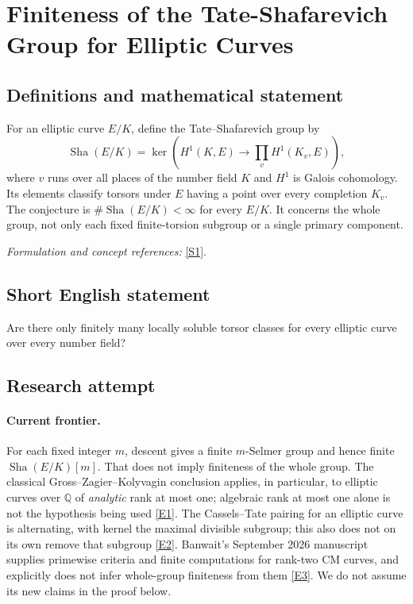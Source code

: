 \documentclass[11pt,a4paper]{article}
\newcommand{\Q}{\mathbb{Q}}
\newcommand{\sref}[2]{\hyperlink{source:#1:#2}{[S#2]}}
\newcommand{\eref}[2]{\hyperlink{extra:#1:#2}{[E#2]}}
\newif\ifshowcatalogue
\newcommand{\cataloguescope}[1]{\ifshowcatalogue
 \paragraph{Exact scope in the supplied catalogue.}
 \begin{quote}\small #1\end{quote}\fi}
\numberwithin{equation}{section}
\begin{document}
\setcounter{section}{0}
\clearpage
\section*{\texorpdfstring{Finiteness of the Tate-Shafarevich Group for Elliptic Curves}{Finiteness of the Tate-Shafarevich Group for Elliptic Curves}}\label{30006701}
\subsection{Definitions and mathematical statement}
For an elliptic curve $E/K$, define the Tate--Shafarevich group by
\[
 \operatorname{Sha}(E/K)=\ker\!\left(H^1(K,E)\longrightarrow\prod_v H^1(K_v,E)\right),
\]
where $v$ runs over all places of the number field $K$ and $H^1$ is Galois cohomology. Its elements classify torsors under $E$ having a point over every completion $K_v$. The conjecture is $\#\operatorname{Sha}(E/K)<\infty$ for every $E/K$. It concerns the whole group, not only each fixed finite-torsion subgroup or a single primary component.
\par\smallskip\textit{Formulation and concept references:} \sref{30006701}{1}.
\cataloguescope{Prove that the Tate-Shafarevich group Sha(E/K) is finite for every elliptic curve E defined over a number field K.}
\subsection{Short English statement}
Are there only finitely many locally soluble torsor classes for every elliptic curve over every number field?
\subsection{Research attempt}

\paragraph{Current frontier.}
For each fixed integer $m$, descent gives a finite $m$-Selmer group and hence finite $\operatorname{Sha}(E/K)[m]$. That does not imply finiteness of the whole group. The classical Gross--Zagier--Kolyvagin conclusion applies, in particular, to elliptic curves over $\Q$ of \emph{analytic} rank at most one; algebraic rank at most one alone is not the hypothesis being used \eref{30006701}{1}. The Cassels--Tate pairing for an elliptic curve is alternating, with kernel the maximal divisible subgroup; this also does not on its own remove that subgroup \eref{30006701}{2}. Banwait's September 2026 manuscript supplies primewise criteria and finite computations for rank-two CM curves, and explicitly does not infer whole-group finiteness from them \eref{30006701}{3}. We do not assume its new claims in the proof below.
\end{document}

